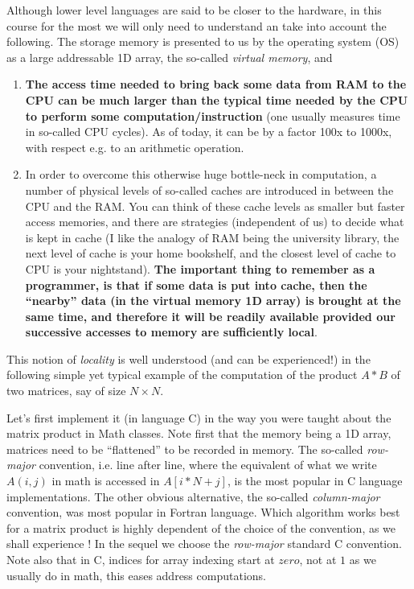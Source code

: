 \documentclass[12pt]{article}
\theoremstyle{plain}
\theoremstyle{remark}
\begin{document}
Although lower level languages are said to be closer to the hardware, in
this course for the most we will only need to understand an take into
account the following. The storage memory is presented to us by the 
operating system (OS) as a large addressable 1D array, the so-called 
{\it virtual memory}, and
\begin{enumerate}
\item 
{\bf The access time needed to bring back some data from RAM to the CPU can
be much larger than the typical time needed by the CPU to perform some
		computation/instruction} (one
usually measures time in so-called CPU cycles). As of today, it can be by a 
factor 100x to 1000x, with respect e.g. to an arithmetic operation.
\item
In order to overcome this otherwise huge bottle-neck in computation, a number of 
physical levels of so-called caches are introduced in between the CPU and the RAM. 
You can think of these cache levels as smaller but faster access memories, and
there are strategies (independent of us) to decide what is kept in cache (I
like the analogy of RAM being the university library, the next level of cache 
is your home bookshelf, and the closest level of cache to CPU is your
nightstand). {\bf The
important thing to remember as a programmer, is that if some data is put into cache,  
then the ``nearby'' data (in the virtual memory 1D array) is brought at the same time, 
and therefore it will be readily available provided our successive accesses to memory 
are sufficiently local}. 
\end{enumerate}

This notion of {\it locality} is well understood (and can be experienced!) in the following
simple yet typical example of the computation of the product $A * B$ of two
matrices, say of size $N \times N.$

\medskip

Let's first implement it (in language C) in the way you were taught about the matrix
product in Math classes. Note first that the memory being a 1D array, matrices need to
be ``flattened'' to be recorded in memory. The so-called {\it row-major} convention, 
i.e. line after line, where the equivalent of what we write $A(i,j)$ in math is
accessed in $A[i * N + j]$, is the most popular in C language implementations. 
The other obvious alternative, the so-called {\it column-major} convention, was 
most popular in Fortran language. Which algorithm works best for a matrix
product is highly dependent of the choice of the convention, as we shall
experience ! In the sequel we choose the {\it row-major} standard C
convention. Note also that in C, indices for array indexing start at $zero$,
not at $1$ as we usually do in math, this eases address computations.  
\end{document}
